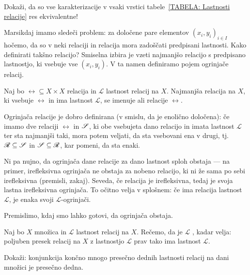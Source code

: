 		\begin{vaja}
			Dokaži, da so vse karakterizacije v vsaki vrstici tabele~\ref{TABELA: Lastnosti relacije} res ekvivalentne!
		\end{vaja}
		
		Marsikdaj imamo sledeči problem: za določene pare elementov $(x_i, y_i)_{i \in I}$ hočemo, da so v neki relaciji in relacija mora zadoščati predpisani lastnosti. Kako definirati takšno relacijo? Smiselna izbira je vzeti najmanjšo relacijo s predpisano lastnostjo, ki vsebuje vse $(x_i, y_i)$. V ta namen definiramo pojem ogrinjače relacij.
		
		\begin{definicija}
			Naj bo $\rel \subseteq X \times X$ relacija in $\mathscr{L}$ lastnost relacij na $X$. Najmanjša relacija na $X$, ki vsebuje $\rel$ in ima lastnost $\mathscr{L}$, se imenuje  ali  relacije $\rel$.
		\end{definicija}
		
		Ogrinjača relacije je dobro definirana (v smislu, da je enolično določena): če imamo dve relaciji $\rel$ in $\srel$, ki obe vsebujeta dano relacijo in imata lastnost $\mathscr{L}$ ter sta najmanjši taki, mora potem veljati, da sta vsebovani ena v drugi, tj.~$\rel \subseteq \srel$ in $\srel \subseteq \rel$, kar pomeni, da sta enaki.
		
		Ni pa nujno, da ogrinjača dane relacije za dano lastnost sploh obstaja --- na primer, irefleksivna ogrinjača ne obstaja za nobeno relacijo, ki ni že sama po sebi irefleksivna (premisli, zakaj). Seveda, če relacija je irefleksivna, tedaj je svoja lastna irefleksivna ogrinjača. To očitno velja v splošnem: če ima relacija lastnost $\mathscr{L}$, je enaka svoji $\mathscr{L}$-ogrinjači.
		
		Premislimo, kdaj smo lahko gotovi, da ogrinjača obstaja.
		
		\begin{definicija}
			Naj bo $X$ množica in $\mathscr{L}$ lastnost relacij na $X$. Rečemo, da je $\mathscr{L}$ , kadar velja: poljuben presek relacij na $X$ z lastnostjo $\mathscr{L}$ prav tako ima lastnost $\mathscr{L}$.
		\end{definicija}
		
		\begin{vaja}\label{VAJA: presečna dednost zaprta za konjunkcije}
			Dokaži: konjunkcija končno mnogo presečno dednih lastnosti relacij na dani množici je presečno dedna.
		\end{vaja}
		
